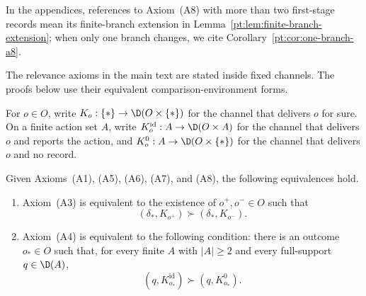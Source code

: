 In the appendices, references to Axiom~\textup{(A8)} with more than two first-stage records mean its
finite-branch extension in Lemma~\ref{pt:lem:finite-branch-extension}; when only one branch changes, we cite
Corollary~\ref{pt:cor:one-branch-a8}.

The relevance axioms in the main text are stated inside fixed channels.  The
proofs below use their equivalent comparison-environment forms.

For $o\in O$, write $K_o:\{\ast\}\to\D(O\times\{\ast\})$ for the channel that
delivers $o$ for sure.  On a finite action set $A$, write
$K^{\mathrm{id}}_o:A\to\D(O\times A)$ for the channel that delivers $o$ and
reports the action, and $K^0_o:A\to\D(O\times\{\ast\})$ for the channel that
delivers $o$ and no record.

\begin{lemma}\label{lem:relevance-bridge}
Given Axioms~\textup{(A1)}, \textup{(A5)}, \textup{(A6)},
\textup{(A7)}, and \textup{(A8)}, the following equivalences hold.
\begin{enumerate}[label=\textup{(\alph*)},leftmargin=*]
\item Axiom~\textup{(A3)} is equivalent to the existence of
  $o^+,o^-\in O$ such that
  \[
    (\delta_\ast,K_{o^+})\succ(\delta_\ast,K_{o^-}).
  \]
\item Axiom~\textup{(A4)} is equivalent to the following condition: there is
  an outcome $o_\ast\in O$ such that, for every finite $A$ with $|A|\ge2$
  and every full-support $q\in\D(A)$,
  \[
    (q,K^{\mathrm{id}}_{o_\ast})\succ(q,K^0_{o_\ast}).
  \]
\end{enumerate}
\end{lemma}

